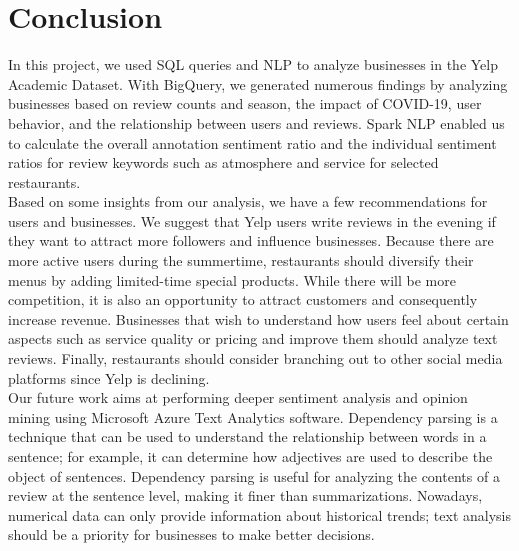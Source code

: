 \documentclass[11pt,journal,compsoc]{IEEEtran}
\begin{document}
\section{Conclusion}
In this project, we used SQL queries and NLP to analyze businesses in the Yelp Academic Dataset. With BigQuery, we generated numerous findings by analyzing businesses based on review counts and season, the impact of COVID-19, user behavior, and the relationship between users and reviews. Spark NLP enabled us to calculate the overall annotation sentiment ratio and the individual sentiment ratios for review keywords such as atmosphere and service for selected restaurants. \\
\indent Based on some insights from our analysis, we have a few recommendations for users and businesses. We suggest that Yelp users write reviews in the evening if they want to attract more followers and influence businesses. Because there are more active users during the summertime, restaurants should diversify their menus by adding limited-time special products. While there will be more competition, it is also an opportunity to attract customers and consequently increase revenue. Businesses that wish to understand how users feel about certain aspects such as service quality or pricing and improve them should analyze text reviews. Finally, restaurants should consider branching out to other social media platforms since Yelp is declining. \\
\indent Our future work aims at performing deeper sentiment analysis and opinion mining using Microsoft Azure Text Analytics software. Dependency parsing is a technique that can be used to understand the relationship between words in a sentence; for example, it can determine how adjectives are used to describe the object of sentences. Dependency parsing is useful for analyzing the contents of a review at the sentence level, making it finer than summarizations. Nowadays, numerical data can only provide information about historical trends; text analysis should be a priority for businesses to make better decisions. \\
\end{document}
